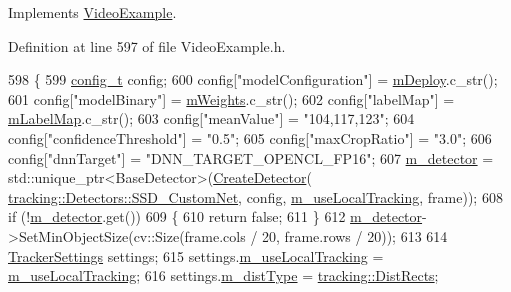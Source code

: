 Implements \mbox{\hyperlink{class_video_example_a93e23d64075fb2f508423e45d15c5421}{Video\+Example}}.



Definition at line 597 of file Video\+Example.\+h.


\begin{DoxyCode}
598     \{
599         \mbox{\hyperlink{defines_8h_a81d657237a541d02f8eeefdd40191920}{config\_t}} config;
600         config[\textcolor{stringliteral}{"modelConfiguration"}] = \mbox{\hyperlink{class_custom_s_s_d_mobile_net_example_a5f0ab35a8bb7c9bbe48750551472d5bd}{mDeploy}}.c\_str();
601         config[\textcolor{stringliteral}{"modelBinary"}] = \mbox{\hyperlink{class_custom_s_s_d_mobile_net_example_a3828507c8d2af5d9ba6f5a7de7fa3b42}{mWeights}}.c\_str();
602         config[\textcolor{stringliteral}{"labelMap"}] = \mbox{\hyperlink{class_custom_s_s_d_mobile_net_example_a15b05488bca85e442ba403ff02a24b5f}{mLabelMap}}.c\_str();
603         config[\textcolor{stringliteral}{"meanValue"}] = \textcolor{stringliteral}{"104,117,123"};
604         config[\textcolor{stringliteral}{"confidenceThreshold"}] = \textcolor{stringliteral}{"0.5"};
605         config[\textcolor{stringliteral}{"maxCropRatio"}] = \textcolor{stringliteral}{"3.0"};
606         config[\textcolor{stringliteral}{"dnnTarget"}] = \textcolor{stringliteral}{"DNN\_TARGET\_OPENCL\_FP16"};
607         \mbox{\hyperlink{class_video_example_a00fee4b18b68d605b87051f3bdaa1c92}{m\_detector}} = std::unique\_ptr<BaseDetector>(\mbox{\hyperlink{_base_detector_8cpp_a7648f35ed8e9d0160414d8e0eaf99c15}{CreateDetector}}(
      \mbox{\hyperlink{namespacetracking_a1edf574df68abf048988b7cbacc52760aad91e73b0e787896ba30df4540e992e7}{tracking::Detectors::SSD\_CustomNet}}, config, 
      \mbox{\hyperlink{class_video_example_a951ee017c4fbb180dfc965a9a35ac69f}{m\_useLocalTracking}}, frame));
608         \textcolor{keywordflow}{if} (!\mbox{\hyperlink{class_video_example_a00fee4b18b68d605b87051f3bdaa1c92}{m\_detector}}.get())
609         \{
610             \textcolor{keywordflow}{return} \textcolor{keyword}{false};
611         \}
612         \mbox{\hyperlink{class_video_example_a00fee4b18b68d605b87051f3bdaa1c92}{m\_detector}}->SetMinObjectSize(cv::Size(frame.cols / 20, frame.rows / 20));
613 
614         \mbox{\hyperlink{struct_tracker_settings}{TrackerSettings}} settings;
615         settings.\mbox{\hyperlink{struct_tracker_settings_a64f4e2f0b2eaeae47316690ab5a5e620}{m\_useLocalTracking}} = \mbox{\hyperlink{class_video_example_a951ee017c4fbb180dfc965a9a35ac69f}{m\_useLocalTracking}};
616         settings.\mbox{\hyperlink{struct_tracker_settings_a2633bd68c2d482a666a5d4bba580cca0}{m\_distType}} = \mbox{\hyperlink{namespacetracking_a55743c5e18b9b228c4ba2587260b2502a43af27628a9ee8e94a23c079eab5d448}{tracking::DistRects}};

\end{DoxyCode}
